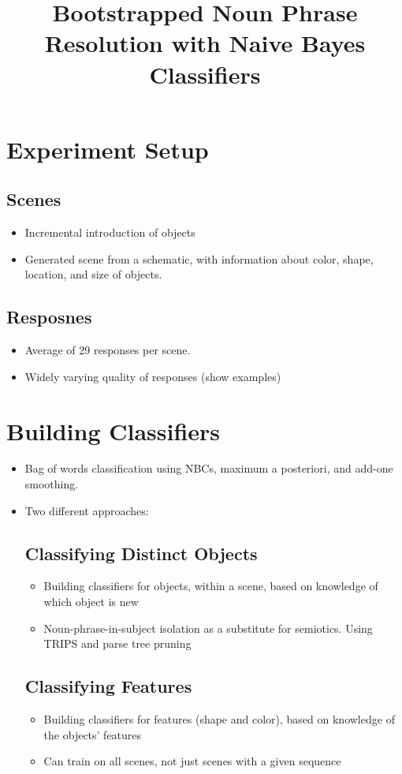 \documentclass{article}
\title{Bootstrapped Noun Phrase Resolution with Naive Bayes Classifiers}
\begin{document}
\maketitle

\section{Experiment Setup}
\subsection{Scenes}
\begin{itemize}
\item Incremental introduction of objects 
\item Generated scene from a schematic, with information about color, shape, location, and size of objects.
\end{itemize}

\subsection{Resposnes}
\begin{itemize}
\item Average of 29 responses per scene.

\item Widely varying quality of responses (show examples)
\end{itemize}

\section{Building Classifiers}
\begin{itemize}
\item Bag of words classification using NBCs, maximum a posteriori, and add-one smoothing.

\item Two different approaches:
\subsection{Classifying Distinct Objects}
\begin{itemize}
    \item Building classifiers for objects, within a scene, based on knowledge of which object is new
    \item Noun-phrase-in-subject isolation as a substitute for semiotics. Using TRIPS and parse tree pruning
\end{itemize}
\subsection{Classifying Features}
\begin{itemize}
    \item Building classifiers for features (shape and color), based on knowledge of the objects' features
    \item Can train on all scenes, not just scenes with a given sequence
\end{itemize}
\end{itemize}
\end{document}

